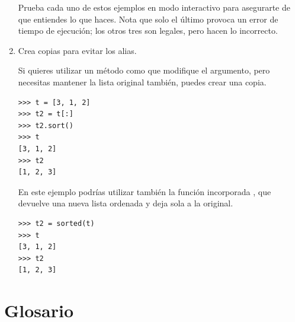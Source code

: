 \begin{enumerate}
Prueba cada uno de estos ejemplos en modo interactivo para asegurarte
de que entiendes lo que haces.  Nota que solo el último
provoca un error de tiempo de ejecución; los otros tres son legales, pero
hacen lo incorrecto.


\item Crea copias para evitar los alias.

Si quieres utilizar un método como  que modifique
el argumento, pero necesitas mantener la lista original
también, puedes crear una copia.

\begin{Verbatim}[frame=single]
>>> t = [3, 1, 2]
>>> t2 = t[:]
>>> t2.sort()
>>> t
[3, 1, 2]
>>> t2
[1, 2, 3]
\end{Verbatim}

En este ejemplo podrías utilizar también la función incorporada ,
que devuelve una nueva lista ordenada y deja sola a la original.

\begin{Verbatim}[frame=single]
>>> t2 = sorted(t)
>>> t
[3, 1, 2]
>>> t2
[1, 2, 3]
\end{Verbatim}

\end{enumerate}



\section{Glosario}

